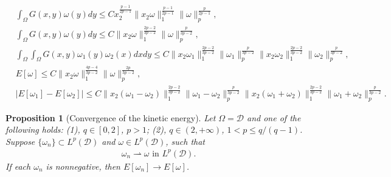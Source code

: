 \documentclass[10pt,a4paper]{amsart}
\newtheorem{prop}{Proposition}
\newcommand{\D}{\mathcal{D}}
\renewcommand{\O}{\Omega}
\renewcommand{\tt}[1]{\text{#1}}
\begin{document}
    \begin{align}
        &\int_{\Omega}G(x,y)\omega(y)dy\leq Cx_2^{\frac{p-1}{2p-1}}\|x_2 \omega\|_1^{\frac{p-1}{2p-1}}\|\omega\|_p^{\frac{p}{2p-1}},\label{ineq:estimate of stream fct}\\
        &\int_{\Omega}G(x,y)\omega(y)dy\leq C\|x_2 \omega\|_1^{\frac{2p-2}{3p-2}}\|\omega\|_p^{\frac{p}{3p-2}},\label{ineq:sup estimate of stream fct}\\
        &\int_{\Omega}\int_{\Omega}G(x,y)\omega_1(y)\omega_2(x)dxdy\leq C\|x_2\omega_1\|_1^{\frac{2p-2}{3p-2}}\|\omega_1\|_p^{\frac{p}{3p-2}}\|x_2\omega_2\|_1^{\frac{2p-2}{3p-2}}\|\omega_2\|_p^{\frac{p}{3p-2}},\label{ineq:estimate of energy crossing term}\\
        &E[\omega]\leq C\|x_2\omega\|_1^{\frac{4p-4}{3p-2}}\|\omega\|_p^{\frac{2p}{3p-2}},\label{ineq:estimate of kinetic energy}\\
        &|E[\omega_1]-E[\omega_2]|\leq C\|x_2(\omega_1-\omega_2)\|_1^{\frac{2p-2}{3p-2}}\|\omega_1-\omega_2\|_p^{\frac{p}{3p-2}}\|x_2(\omega_1+\omega_2)\|_1^{\frac{2p-2}{3p-2}}\|\omega_1+\omega_2\|_p^{\frac{p}{3p-2}}.\label{ineq:estimate of energy difference}
    \end{align}

\begin{prop}[Convergence of the kinetic energy]
\label{prop:weak_finite_volume_energy_convergence}
Let $\O=\D$ and one of the following holds: (1), $q\in[0,2]$, $p>1$; (2), $q\in (2, + \infty)$, $ 1 < p \leq q/(q-1)$.
Suppose \(\{\omega_n\} \subset L^p(\D)\) and \(\omega \in L^p(\D)\), such that 
\begin{align*}
    \omega_n \rightharpoonup \omega  \tt{ in } L^p(\D).
\end{align*}
If each $\omega_n$ is nonnegative, then \(E[\omega_n] \to E[\omega]\).
\end{prop}
\end{document}
